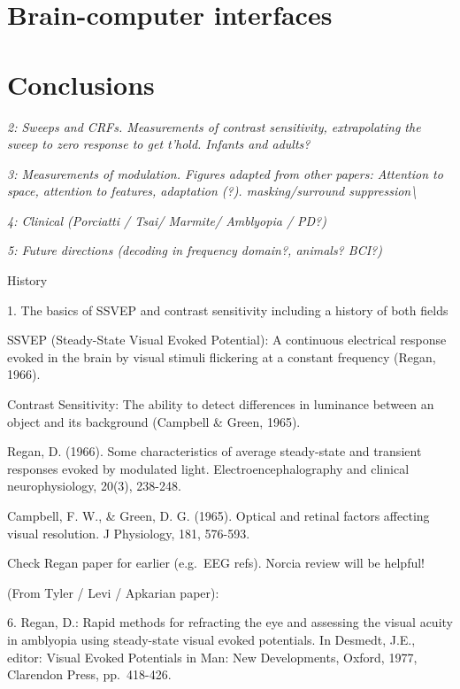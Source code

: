 \documentclass[
  letterpaper,
  DIV=11,
  numbers=noendperiod]{scrartcl}
\begin{document}
\section{Brain-computer interfaces}\label{brain-computer-interfaces}

\section{Conclusions}\label{conclusions}

\emph{2: Sweeps and CRFs. Measurements of contrast sensitivity,
extrapolating the sweep to zero response to get t'hold. Infants and
adults?}

\emph{3: Measurements of modulation. Figures adapted from other papers:
Attention to space, attention to features, adaptation (?).
masking/surround suppression\textbackslash{}}

\emph{4: Clinical (Porciatti / Tsai/ Marmite/ Amblyopia / PD?)}

\emph{5: Future directions (decoding in frequency domain?, animals?
BCI?)}

\label{anchor-2}{}History

\label{anchor-3}{}1. The basics of SSVEP and contrast
sensitivity including a history of both fields

SSVEP (Steady-State Visual Evoked Potential): A continuous electrical
response evoked in the brain by visual stimuli flickering at a constant
frequency (Regan, 1966).

Contrast Sensitivity: The ability to detect differences in luminance
between an object and its background (Campbell \& Green, 1965).

Regan, D. (1966). Some characteristics of average steady-state and
transient responses evoked by modulated light. Electroencephalography
and clinical neurophysiology, 20(3), 238-248.

Campbell, F. W., \& Green, D. G. (1965). Optical and retinal factors
affecting visual resolution. J Physiology, 181, 576-593.

Check Regan paper for earlier (e.g.~EEG refs). Norcia review will be
helpful!

(From Tyler / Levi / Apkarian paper):

6. Regan, D.: Rapid methods for refracting the eye and assessing the
visual acuity in amblyopia using steady-state visual evoked potentials.
In Desmedt, J.E., editor: Visual Evoked Potentials in Man: New
Developments, Oxford, 1977, Clarendon Press, pp.~418-426.
\end{document}
